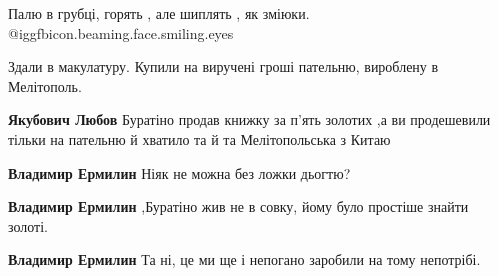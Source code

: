 \begin{itemize}
Палю в грубці, горять , але шиплять , як зміюки. @igg{fbicon.beaming.face.smiling.eyes} 

 
Здали в макулатуру. Купили на виручені гроші пательню, вироблену в Мелітополь.

\begin{itemize}
 
\textbf{Якубович Любов} Буратіно продав книжку за п'ять золотих ,а ви продешевили тільки на пательню й хватило та й та Мелітопольська з Китаю

\begin{itemize}
 
\textbf{Владимир Ермилин} Ніяк не можна без ложки дьогтю?

 
\textbf{Владимир Ермилин} ,Буратіно жив не в совку, йому було простіше знайти золоті.

 
\textbf{Владимир Ермилин} Та ні, це ми ще і непогано заробили на тому непотрібі.
\end{itemize}

 

\end{itemize}
\end{itemize}
